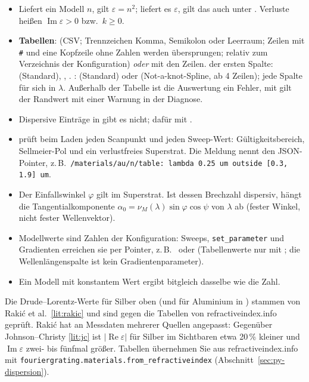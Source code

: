 \begin{itemize}
  \item Liefert ein Modell $n$, gilt $\varepsilon=n^2$; liefert es $\varepsilon$, gilt das auch unter .
        Verluste heißen $\operatorname{Im}\varepsilon>0$ bzw.\ $k\ge0$.
  \item \textbf{Tabellen}:  (CSV; Trennzeichen Komma, Semikolon oder Leerraum; Zeilen mit \texttt{\#} und
        eine Kopfzeile ohne Zahlen werden übersprungen; relativ zum Verzeichnis der Konfiguration) \emph{oder}
         mit den Zeilen.  der ersten Spalte:  (Standard), , .
        :  (Standard) oder  (Not-a-knot-Spline, ab 4 Zeilen); jede
        Spalte für sich in $\lambda$. Außerhalb der Tabelle ist die Auswertung ein Fehler, mit
         gilt der Randwert mit einer Warnung in der Diagnose.
  \item Dispersive Einträge in  gibt es nicht; dafür  mit .
  \item \FG{} prüft beim Laden jeden Scanpunkt und jeden Sweep-Wert: Gültigkeitsbereich, Sellmeier-Pol und ein
        verlustfreies Superstrat. Die Meldung nennt den JSON-Pointer, z.\,B.\
        \texttt{/materials/au/n/table: lambda 0.25 um outside [0.3, 1.9] um}.
  \item Der Einfallswinkel $\varphi$ gilt im Superstrat. Ist dessen Brechzahl dispersiv, hängt die
        Tangentialkomponente $\alpha_0=\nu_M(\lambda)\sin\varphi\cos\psi$ von $\lambda$ ab (fester Winkel, nicht
        fester Wellenvektor).
  \item Modellwerte sind Zahlen der Konfiguration: Sweeps, \texttt{set\_parameter} und Gradienten erreichen sie per
        Pointer, z.\,B.\ \val{/materials/sio2/n/\allowbreak sellmeier/B/0} oder 
        (Tabellenwerte nur mit \key{data}; die Wellenlängenspalte ist kein Gradientenparameter).
  \item Ein Modell mit konstantem Wert ergibt bitgleich dasselbe wie die Zahl.
\end{itemize}
\begin{hinweis}
Die Drude--Lorentz-Werte für Silber oben (und für Aluminium in ) stammen von Raki\'c
et al.\ \ref{lit:rakic} und sind gegen die Tabellen von refractiveindex.info geprüft. Raki\'c hat an Messdaten mehrerer Quellen
angepasst: Gegenüber Johnson--Christy \ref{lit:jc} ist $|\operatorname{Re}\varepsilon|$ für Silber im Sichtbaren etwa 20\,\%
kleiner und $\operatorname{Im}\varepsilon$ zwei- bis fünfmal größer. Tabellen übernehmen Sie aus refractiveindex.info
mit \texttt{fouriergrating.materials.from\_refractiveindex} (Abschnitt~\ref{sec:py-dispersion}).
\end{hinweis}

